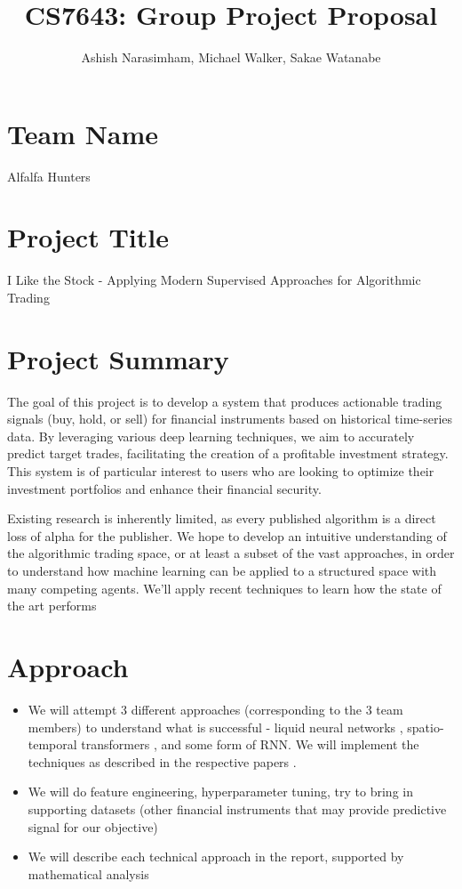 \documentclass[
	letterpaper, %
]{jdf}
\author{Ashish Narasimham, Michael Walker, Sakae Watanabe}
\title{CS7643: Group Project Proposal}
\begin{document}
\maketitle

\section*{Team Name}

Alfalfa Hunters

\section*{Project Title}

I Like the Stock - Applying Modern Supervised Approaches for Algorithmic Trading

\section*{Project Summary}
The goal of this project is to develop a system that produces actionable trading signals (buy, hold, or sell) for financial instruments based on historical time-series data. By leveraging various deep learning techniques, we aim to accurately predict target trades, facilitating the creation of a profitable investment strategy. This system is of particular interest to users who are looking to optimize their investment portfolios and enhance their financial security.

Existing research is inherently limited, as every published algorithm is a direct loss of alpha for the publisher. We hope to develop an intuitive understanding of the algorithmic trading space, or at least a subset of the vast approaches, in order to understand how machine learning can be applied to a structured space with many competing agents. We’ll apply recent techniques to learn how the state of the art performs


\section*{Approach}

\begin{itemize}
    \item We will attempt 3 different approaches (corresponding to the 3 team members) to understand what is successful - liquid neural networks \cite{hasani_liquid_2020}, spatio-temporal transformers \cite{boyle_spatiotemporal_2023}, and some form of RNN. We will implement the techniques as described in the respective papers \citep{kazemi_time2vec_2019,su_self-attentive_2022}.
    \item We will do feature engineering, hyperparameter tuning, try to bring in supporting datasets (other financial instruments that may provide predictive signal for our objective)
    \item We will describe each technical approach in the report, supported by mathematical analysis
\end{itemize}
\end{document}
